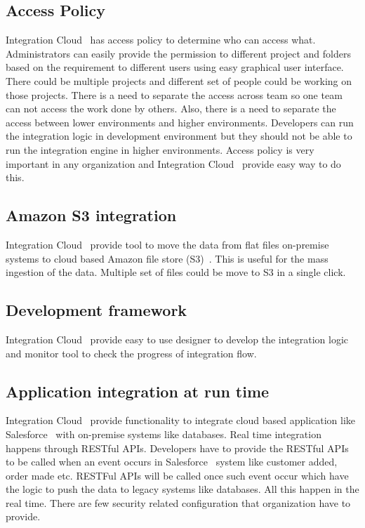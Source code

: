 \subsection{Access Policy}

Integration Cloud~\cite{hid-sp18-511-iics} has access policy to determine who can access what. Administrators can easily provide the permission to different project and folders based on the requirement to different users using easy graphical user interface. There could be multiple projects and different set of people could be working on those projects. There is a need to separate the access across team so one team can not access the work done by others. Also, there is a need to separate the access between lower environments and higher environments. Developers can run the integration logic in development environment but they should not be able to run the integration engine in higher environments. Access policy is very important in any organization and Integration Cloud~\cite{hid-sp18-511-iics} provide easy way to do this.

\subsection{Amazon S3 integration}

Integration Cloud~\cite{hid-sp18-511-iics} provide tool to move the data from flat files on-premise systems to cloud based Amazon file store (S3)~\cite{hid-sp18-511-aws-s3}. This is useful for the mass ingestion of the data. Multiple set of files could be move to S3 in a single click.

\subsection{Development framework}

Integration Cloud~\cite{hid-sp18-511-iics} provide easy to use designer to develop the integration logic and monitor tool to check the progress of integration flow.

\subsection{Application integration at run time}

Integration Cloud~\cite{hid-sp18-511-iics} provide functionality to integrate cloud based application like Salesforce~\cite{hid-sp18-511-salesforce} with on-premise systems like databases. Real time integration happens through RESTful APIs. Developers have to provide the RESTful APIs to be called when an event occurs in Salesforce~\cite{hid-sp18-511-salesforce} system like customer added, order made etc. RESTFul APIs will be called once such event occur which have the logic to push the data to legacy systems like databases. All this happen in the real time. There are few security related configuration that organization have to provide.

